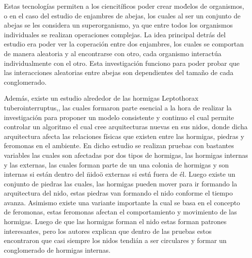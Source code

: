 \documentclass[conference]{IEEEtran}
\begin{document}
Estas tecnolog\'ias permiten a los ciencit\'ificos poder crear mo\'delos de organismos, o en el caso del estudio de enjambres de abejas, los cuales al ser un conjunto de abejas se les considera un superorganismo, ya que entre todos los organismos individuales se realizan operaciones complejas.\cite{TMRT01} La idea principal detr\'as del estudio era poder ver la coperaci\'on entre dos enjambres, los cuales se comportan de manera aleatoria y al encontrarse con otro, cada organismo interact\'ua individualmente con el otro. Esta investigaci\'on funciono para poder probar que las interacciones aleatorias entre abejas son dependientes del tama\~no de cada conglomerado.  

Adem\'as, existe un estudio alrededor de las hormigas  Leptothorax tuberointerruptus,\cite{LP01}, las cuales formaron parte esencial a la hora de realizar la investigaci\'on para proponer un modelo consistente y continuo el cual permite controlar un algoritmo el cual cree arquitecturas nuevas en sus nidos, donde dicha arquitectura afecta las relaciones f\'isicas que existen entre las hormigas, piedras y feromonas en el ambiente.
En dicho estudio se realizan pruebas con bastantes variables las cuales son afectadas por dos tipos de hormigas, las hormigas internas y las externas, las cuales forman parte de un una colonia de hormigas y son internas si est\'an dentro del \"nido\" o externas si est\'n fuera de \'el. Luego existe un conjunto de piedras las cuales, las hormigas pueden mover para ir formando la arquitectura del nido, estas piedras van formando el nido conforme el tiempo avanza. Asimismo existe una variante importante la cual se basa en el concepto de feromonas, estas feromonas afectan el comportamiento y movimiento de las hormigas.\cite{LP01}
Luego de que las hormigas forman el nido estas forman patrones interesantes, pero los autores explican que dentro de las pruebas estos encontraron que casi siempre los nidos tendi\'an a ser circulares y formar un conglomerado de hormigas internas. 
\end{document}
